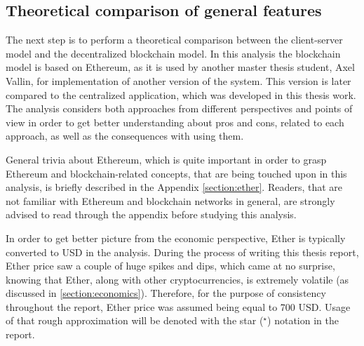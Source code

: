 \subsection{Theoretical comparison of general features} \label{section:featureanalysis}
The next step is to perform a theoretical comparison between the client-server model and the decentralized blockchain model. In this analysis the blockchain model is based on Ethereum, as it is used by another master thesis student, Axel Vallin, for implementation of another version of the system. This version is later compared to the centralized application, which was developed in this thesis work. The analysis considers both approaches from different perspectives and points of view in order to get better understanding about pros and cons, related to each approach, as well as the consequences with using them.

General trivia about Ethereum, which is quite important in order to grasp Ethereum and blockchain-related concepts, that are being touched upon in this analysis, is briefly described in the Appendix \ref{section:ether}. Readers, that are not familiar with Ethereum and blockchain networks in general, are strongly advised to read through the appendix before studying this analysis.

In order to get better picture from the economic perspective, Ether is typically converted to USD in the analysis. During the process of writing this thesis report, Ether price saw a couple of huge spikes and dips, which came at no surprise, knowing that Ether, along with other cryptocurrencies, is extremely volatile (as discussed in \ref{section:economics}). Therefore, for the purpose of consistency throughout the report, Ether price was assumed being equal to 700 USD. Usage of that rough approximation will be denoted with the star ($^\star$) notation in the report.











